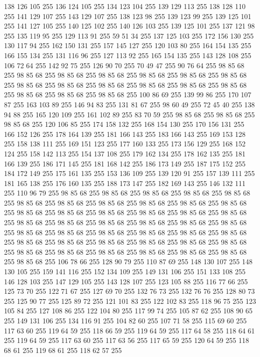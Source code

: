 138 126 105 255 136 124 105 255 134 123 104 255 139 129 113 255 138 128 110 255 141 129 107 255 143 129 107 255 138 123 98 255 139 123 99 255 139 125 101 255 141 127 105 255 140 125 102 255 140 126 103 255 139 125 101 255 137 121 98 255 135 119 95 255 129 113 91 255 59 51 34 255 137 125 103 255 172 156 130 255 130 117 94 255 162 150 131 255 157 145 127 255 120 103 80 255 164 154 135 255 166 155 134 255 131 116 96 255 127 113 92 255 165 154 135 255 143 128 108 255 106 72 64 255 142 92 75 255 126 90 70 255 70 49 47 255 90 76 64 255 98 85 68 255 98 85 68 255 98 85 68 255 98 85 68 255 98 85 68 255 98 85 68 255 98 85 68 255 98 85 68 255 98 85 68 255 98 85 68 255 98 85 68 255 98 85 68 255 98 85 68 255 98 85 68 255 98 85 68 255 98 85 68 255 100 86 69 255 139 99 86 255 170 107 87 255 163 103 89 255 146 94 83 255 131 81 67 255 98 60 49 255 72 45 40 255 138 94 88 255 165 120 109 255 161 102 89 255 83 70 59 255 98 85 68 255
98 85 68 255 98 85 68 255 120 106 85 255 174 158 132 255 168 154 130 255 170 156 131 255 166 152 126 255 178 164 139 255 181 166 143 255 183 166 143 255 169 153 128 255 158 138 111 255 169 151 123 255 177 160 133 255 173 156 129 255 168 152 124 255 158 142 113 255 154 137 108 255 179 162 134 255 178 162 135 255 181 166 139 255 186 171 145 255 181 168 142 255 186 173 149 255 187 175 152 255 184 172 149 255 175 161 135 255 153 136 109 255 139 120 91 255 157 139 111 255 181 165 138 255 176 160 135 255 188 173 147 255 182 169 143 255 146 132 111 255 110 96 79 255 98 85 68 255 98 85 68 255 98 85 68 255 98 85 68 255 98 85 68 255 98 85 68 255 98 85 68 255 98 85 68 255 98 85 68 255 98 85 68 255 98 85 68 255 98 85 68 255 98 85 68 255 98 85 68 255 98 85 68 255 98 85 68 255 98 85 68 255 98 85 68 255 98 85 68 255 98 85 68 255 98 85 68 255 98 85 68 255 98 85 68 255 98 85 68 255 98 85 68 255 98 85 68 255 98 85 68 255 98 85 68 255
98 85 68 255 98 85 68 255 98 85 68 255 98 85 68 255 98 85 68 255 98 85 68 255 98 85 68 255 98 85 68 255 98 85 68 255 98 85 68 255 98 85 68 255 98 85 68 255 98 85 68 255 98 85 68 255 106 78 66 255 128 90 79 255 110 87 69 255 148 130 107 255 148 130 105 255 159 141 116 255 152 134 109 255 149 131 106 255 151 133 108 255 146 128 103 255 147 129 105 255 143 128 107 255 123 105 88 255 116 77 66 255 125 73 70 255 122 71 67 255 127 69 70 255 132 76 73 255 132 76 76 255 128 80 73 255 125 90 77 255 125 89 72 255 121 101 83 255 122 102 83 255 118 96 75 255 123 105 84 255 127 108 86 255 122 104 80 255 117 99 74 255 105 87 62 255 108 90 65 255 149 131 106 255 134 116 91 255 104 82 60 255 107 71 58 255 115 69 60 255 117 63 60 255 119 64 59 255 118 66 59 255 119 64 59 255 117 64 58 255 118 64 61 255 119 64 59 255 117 63 60 255 117 63 56 255 117 65 59 255 120 64 59 255 118 68 61 255 119 68 61 255 118 62 57 255
